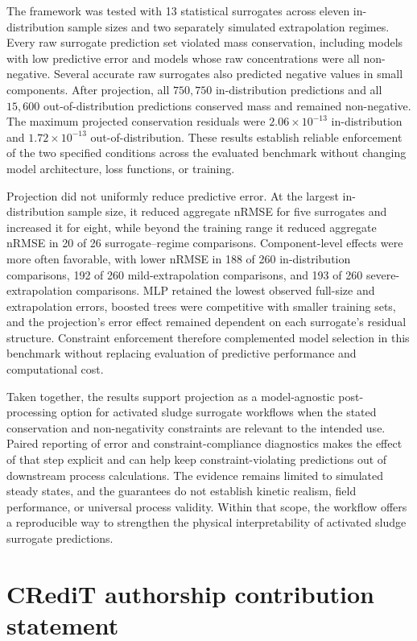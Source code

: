 \documentclass[a4paper,fleqn]{cas-sc}
\begin{document}
The framework was tested with 13 statistical surrogates across eleven in-distribution sample sizes and two separately simulated extrapolation regimes. Every raw surrogate prediction set violated mass conservation, including models with low predictive error and models whose raw concentrations were all non-negative. Several accurate raw surrogates also predicted negative values in small components. After projection, all $750{,}750$ in-distribution predictions and all $15{,}600$ out-of-distribution predictions conserved mass and remained non-negative. The maximum projected conservation residuals were $2.06\times10^{-13}$ in-distribution and $1.72\times10^{-13}$ out-of-distribution. These results establish reliable enforcement of the two specified conditions across the evaluated benchmark without changing model architecture, loss functions, or training.

Projection did not uniformly reduce predictive error. At the largest in-distribution sample size, it reduced aggregate nRMSE for five surrogates and increased it for eight, while beyond the training range it reduced aggregate nRMSE in 20 of 26 surrogate--regime comparisons. Component-level effects were more often favorable, with lower nRMSE in 188 of 260 in-distribution comparisons, 192 of 260 mild-extrapolation comparisons, and 193 of 260 severe-extrapolation comparisons. MLP retained the lowest observed full-size and extrapolation errors, boosted trees were competitive with smaller training sets, and the projection's error effect remained dependent on each surrogate's residual structure. Constraint enforcement therefore complemented model selection in this benchmark without replacing evaluation of predictive performance and computational cost.

Taken together, the results support projection as a model-agnostic post-processing option for activated sludge surrogate workflows when the stated conservation and non-negativity constraints are relevant to the intended use. Paired reporting of error and constraint-compliance diagnostics makes the effect of that step explicit and can help keep constraint-violating predictions out of downstream process calculations. The evidence remains limited to simulated steady states, and the guarantees do not establish kinetic realism, field performance, or universal process validity. Within that scope, the workflow offers a reproducible way to strengthen the physical interpretability of activated sludge surrogate predictions.

\section*{CRediT authorship contribution statement}
\end{document}
